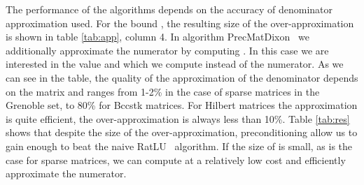 \documentclass{acm_proc_article-sp}   \usepackage{graphicx,url}
\newcommand{\algrdRat}{RatLU}
\newcommand{\algrdDixon}{PrecMatDixon}
\begin{document}
The performance of the algorithms depends on the accuracy of denominator approximation used. For the bound , the resulting size of the over-approximation is shown in table \ref{tab:app}, column 4. In algorithm \algrdDixon~ we additionally approximate the numerator by computing . In this case we are interested in the value  and  which we compute instead of the numerator. As we can see in the table, the quality of the approximation of the denominator depends on the matrix and ranges from 1-2\% in the case of sparse matrices in the Grenoble set, to 80\% for Bccstk matrices. For Hilbert matrices the approximation is quite efficient, the over-approximation is always less than 10\%. Table \ref{tab:res} shows that despite the size of the over-approximation, preconditioning allow us to gain enough to beat the naive \algrdRat~ algorithm. If the size of  is small, as is the case for sparse matrices, we can compute  at a  relatively low cost and efficiently approximate the numerator.
\end{document}
